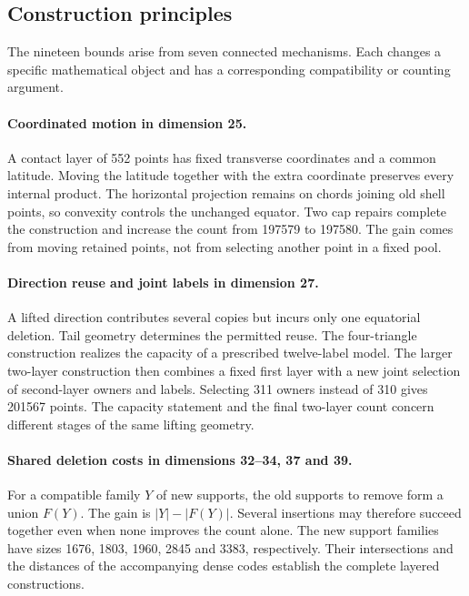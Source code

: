 

\subsection{Construction principles}

The nineteen bounds arise from seven connected mechanisms. Each changes
a specific mathematical object and has a corresponding compatibility or
counting argument.

\paragraph{Coordinated motion in dimension 25.}
A contact layer of 552 points has fixed transverse coordinates and a
common latitude. Moving the latitude together with the extra coordinate
preserves every internal product. The horizontal projection remains on
chords joining old shell points, so convexity controls the unchanged
equator. Two cap repairs complete the construction and increase the count
from 197579 to 197580. The gain comes from moving retained points, not
from selecting another point in a fixed pool.

\paragraph{Direction reuse and joint labels in dimension 27.}
A lifted direction contributes several copies but incurs only one
equatorial deletion. Tail geometry determines the permitted reuse.
The four-triangle construction realizes the capacity of a prescribed
twelve-label model. The larger two-layer construction then combines
a fixed first layer with a new joint selection of second-layer owners
and labels. Selecting 311 owners instead of 310 gives 201567 points.
The capacity statement and the final two-layer count concern different
stages of the same lifting geometry.

\paragraph{Shared deletion costs in dimensions 32--34, 37 and 39.}
For a compatible family $Y$ of new supports, the old supports to remove
form a union $F(Y)$. The gain is $|Y|-|F(Y)|$. Several insertions may
therefore succeed together even when none improves the count alone.
The new support families have sizes 1676, 1803, 1960, 2845 and 3383,
respectively. Their intersections and the distances of the accompanying
dense codes establish the complete layered constructions.

